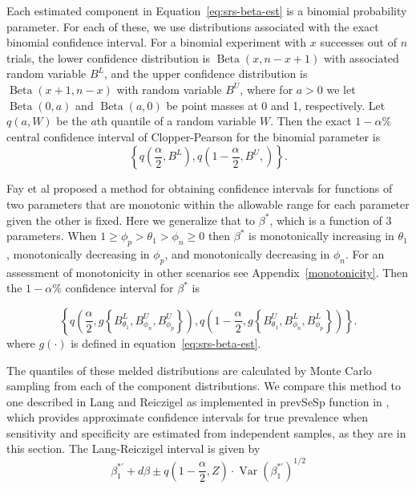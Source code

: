 \documentclass[AMA,STIX1COL]{WileyNJD-v2}
\DeclareMathOperator{\Var}{Var}
\begin{document}
Each estimated component in Equation~\ref{eq:srs-beta-est} is a binomial probability parameter.
For each of these, we use distributions associated with  the exact binomial confidence interval.
For a binomial experiment with \( x \) successes out of \( n \) trials, the lower confidence distribution is \( \operatorname{Beta}(x, n - x + 1) \) with associated random variable \( B^L \), and the upper confidence distribution  is \( \operatorname{Beta}(x + 1, n - x)\) with random variable \( B^U \), where for $a>0$ we let \( \operatorname{Beta}(0,a) \) and \( \operatorname{Beta}(a,0) \) be point masses at 0 and 1, respectively.
Let \( q(a, W) \) be the \( a \)th quantile of a random variable \( W \). Then the exact \( 1 - \alpha \)\% central confidence interval of Clopper-Pearson\cite{10.1093/biomet/26.4.404} for the binomial parameter is 
\begin{equation}
\left\{ q \left( \frac{\alpha}{2}, B^L \right), q \left( 1 - \frac{\alpha}{2}, B^U, \right) \right\}.
\label{eq:C-P}
\end{equation}

Fay et al \cite{FayP:2015} proposed a method for obtaining confidence intervals for functions of two parameters that are monotonic within the allowable range  for each parameter given the other is fixed. Here we generalize that to $\beta^*$, which is a function of 3 parameters. When $1 \geq \phi_p > \theta_1 > \phi_n \geq 0$ then $\beta^*$ is monotonically increasing in $\theta_1$, monotonically decreasing in $\phi_p$, and monotonically decreasing in $\phi_n$.
For an assessment of monotonicity in other scenarios see Appendix~\ref{monotonicity}.
Then the \( 1-\alpha \)\% confidence interval for \( \beta^* \) is 

\begin{equation}
    \left\{ q \left( \frac{\alpha}{2}, g \left\{ B_{\theta_1}^L, B_{\phi_n}^U, B_{\phi_p}^U \right\}   \right),  
            q \left( 1 - \frac{\alpha}{2},  g \left\{ B_{\theta_1}^U, B_{\phi_n}^L, B_{\phi_p}^L \right\}   \right) \right\}.
\label{eq:srs-conf-int}
\end{equation}
where $g(\cdot)$ is defined in equation~\ref{eq:srs-beta-est}.


The quantiles of these melded distributions are calculated by Monte Carlo sampling from each of the component distributions.
We compare this method to one described in Lang and Reiczigel \cite{Lang:2014} as implemented in prevSeSp function in \cite{asht}, which provides approximate confidence intervals for true prevalence when sensitivity and specificity are estimated from independent samples, as they are  in this section.
The Lang-Reiczigel interval is given by
\begin{equation}
\beta_1^{*\prime} + d\beta \pm q\left( 1 - \frac{\alpha}{2}, Z \right) \cdot \Var(\beta_1^{*\prime})^{1/2}    
\end{equation}
\end{document}
